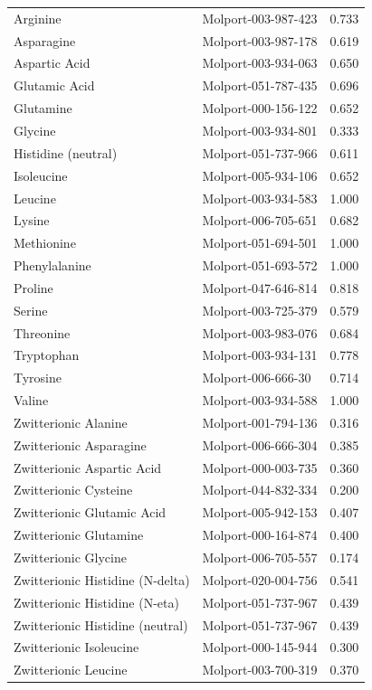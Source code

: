 \documentclass[a4paper,11pt]{article}\usepackage[]{graphicx}\usepackage[]{xcolor}
\begin{document}
\begin{enumerate}
\begin{table}[H]
\begin{tabular}[t]{llr}
Arginine & Molport-003-987-423 & 0.733\\
Asparagine & Molport-003-987-178 & 0.619\\
Aspartic Acid & Molport-003-934-063 & 0.650\\
Glutamic Acid & Molport-051-787-435 & 0.696\\
Glutamine & Molport-000-156-122 & 0.652\\
Glycine & Molport-003-934-801 & 0.333\\
Histidine (neutral) & Molport-051-737-966 & 0.611\\
Isoleucine & Molport-005-934-106 & 0.652\\
Leucine & Molport-003-934-583 & 1.000\\
Lysine & Molport-006-705-651 & 0.682\\
Methionine & Molport-051-694-501 & 1.000\\
Phenylalanine & Molport-051-693-572 & 1.000\\
Proline & Molport-047-646-814 & 0.818\\
Serine & Molport-003-725-379 & 0.579\\
Threonine & Molport-003-983-076 & 0.684\\
Tryptophan & Molport-003-934-131 & 0.778\\
Tyrosine & Molport-006-666-30 & 0.714\\
Valine & Molport-003-934-588 & 1.000\\
Zwitterionic Alanine & Molport-001-794-136 & 0.316\\
Zwitterionic Asparagine & Molport-006-666-304 & 0.385\\
Zwitterionic Aspartic Acid & Molport-000-003-735 & 0.360\\
Zwitterionic Cysteine & Molport-044-832-334 & 0.200\\
Zwitterionic Glutamic Acid & Molport-005-942-153 & 0.407\\
Zwitterionic Glutamine & Molport-000-164-874 & 0.400\\
Zwitterionic Glycine & Molport-006-705-557 & 0.174\\
Zwitterionic Histidine (N-delta) & Molport-020-004-756 & 0.541\\
Zwitterionic Histidine (N-eta) & Molport-051-737-967 & 0.439\\
Zwitterionic Histidine (neutral) & Molport-051-737-967 & 0.439\\
Zwitterionic Isoleucine & Molport-000-145-944 & 0.300\\
Zwitterionic Leucine & Molport-003-700-319 & 0.370\\

\end{tabular}
\end{table}
\end{enumerate}
\end{document}
